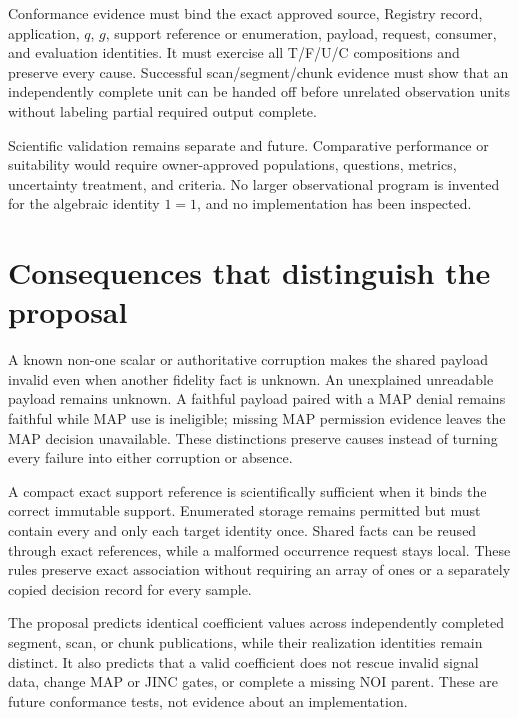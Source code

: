 Conformance evidence must bind the exact approved source, Registry record,
application, \(q\), \(g\), support reference or enumeration, payload, request,
consumer, and evaluation identities. It must exercise all T/F/U/C
compositions and preserve every cause. Successful scan/segment/chunk evidence
must show that an independently complete unit can be handed off before
unrelated observation units without labeling partial required output complete.

Scientific validation remains separate and future. Comparative performance or
suitability would require owner-approved populations, questions, metrics,
uncertainty treatment, and criteria. No larger observational program is
invented for the algebraic identity \(1=1\), and no implementation has been
inspected.

\else

\section{Consequences that distinguish the proposal}

A known non-one scalar or authoritative corruption makes the shared payload
invalid even when another fidelity fact is unknown. An unexplained unreadable
payload remains unknown. A faithful payload paired with a MAP denial remains
faithful while MAP use is ineligible; missing MAP permission evidence leaves
the MAP decision unavailable. These distinctions preserve causes instead of
turning every failure into either corruption or absence.

A compact exact support reference is scientifically sufficient when it binds
the correct immutable support. Enumerated storage remains permitted but must
contain every and only each target identity once. Shared facts can be reused
through exact references, while a malformed occurrence request stays local.
These rules preserve exact association without requiring an array of ones or
a separately copied decision record for every sample.

The proposal predicts identical coefficient values across independently
completed segment, scan, or chunk publications, while their realization
identities remain distinct. It also predicts that a valid coefficient does
not rescue invalid signal data, change MAP or JINC gates, or complete a
missing NOI parent. These are future conformance tests, not evidence about an
implementation.

\fi
